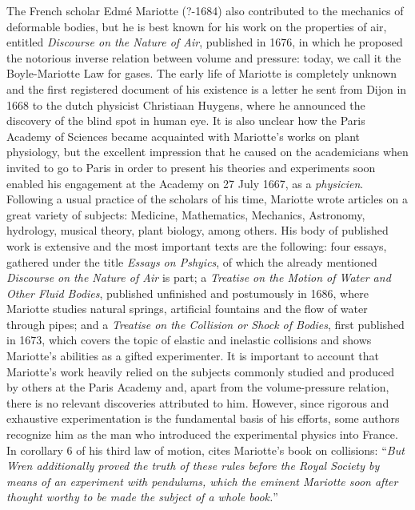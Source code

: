 The French scholar Edm\'e Mariotte (?-1684) also contributed to the mechanics of deformable bodies, but he is best known for his work on the properties of air, entitled \emph{Discourse on the Nature of Air}, published in 1676, in which he proposed the notorious inverse relation between volume and pressure: today, we call it the Boyle-Mariotte Law for gases. The early life of Mariotte is completely unknown and the first registered document of his existence is a letter he sent from Dijon in 1668 to the dutch physicist Christiaan Huygens, where he announced the discovery of the blind spot in human eye. It is also unclear how the Paris Academy of Sciences became acquainted with Mariotte's works on plant physiology, but the excellent impression that he caused on the academicians when invited to go to Paris in order to present his theories and experiments soon enabled his engagement at the Academy on 27 July 1667, as a \emph{physicien}. Following a usual practice of the scholars of his time, Mariotte wrote articles on a great variety of subjects: Medicine, Mathematics, Mechanics, Astronomy, hydrology, musical theory, plant biology, among others. His body of published work is extensive and the most important texts are the following: four essays, gathered under the title \emph{Essays on Pshyics}, of which the already mentioned \emph{Discourse on the Nature of Air} is part; a \emph{Treatise on the Motion of Water and Other Fluid Bodies}, published unfinished and postumously in 1686, where Mariotte studies natural springs, artificial fountains and the flow of water through pipes; and a \emph{Treatise on the Collision or Shock of Bodies}, first published in 1673, which covers the topic of elastic and inelastic collisions and shows Mariotte's abilities as a gifted experimenter. It is important to account that Mariotte's work heavily relied on the subjects commonly studied and produced by others at the Paris Academy and, apart from the volume-pressure relation, there is no relevant discoveries attributed to him. However, since rigorous and exhaustive experimentation is the fundamental basis of his efforts, some authors recognize him as the man who introduced the experimental physics into France. In corollary 6 of his third law of motion, \cite{newton_1999_1} cites Mariotte's book on collisions: ``\emph{But Wren additionally proved the truth of these rules before the Royal Society by means of an experiment with pendulums, which the eminent Mariotte soon after thought worthy to be made the subject of a whole book.}''
  

